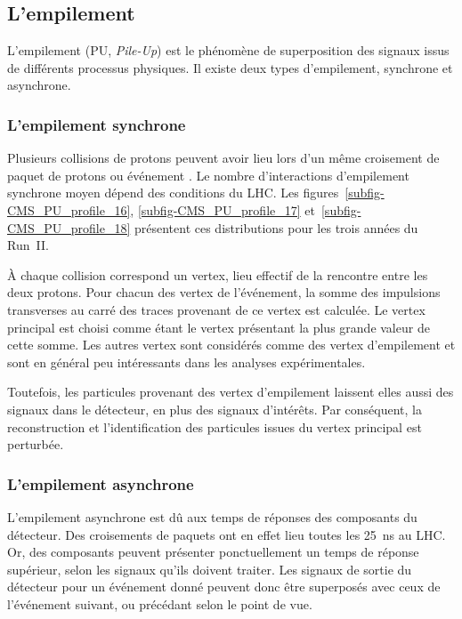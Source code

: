 \subsection{L'empilement}\label{chapter-LHC-section-LHC-subsec-PU}
L'empilement (PU, \emph{Pile-Up}) est le phénomène de superposition des signaux issus de différents processus physiques.
Il existe deux types d'empilement, synchrone et asynchrone.
\subsubsection{L'empilement synchrone}
Plusieurs collisions de protons peuvent avoir lieu lors d'un même  croisement de paquet de protons ou \og événement \fg.
Le nombre d'interactions d'empilement synchrone moyen dépend des conditions du LHC.
Les figures~\ref{subfig-CMS_PU_profile_16}, \ref{subfig-CMS_PU_profile_17} et~\ref{subfig-CMS_PU_profile_18} présentent ces distributions pour les trois années du Run~II.
\par À chaque collision correspond un vertex, lieu effectif de la rencontre entre les deux protons.
Pour chacun des vertex de l'événement, la somme des impulsions transverses au carré des traces provenant de ce vertex est calculée.
Le vertex principal est choisi comme étant le vertex présentant la plus grande valeur de cette somme.
Les autres vertex sont considérés comme des vertex d'empilement et sont en général peu intéressants dans les analyses expérimentales.
\par Toutefois, les particules provenant des vertex d'empilement laissent elles aussi des signaux dans le détecteur, en plus des signaux d'intérêts.
Par conséquent, la reconstruction et l'identification des particules issues du vertex principal est perturbée.
\subsubsection{L'empilement asynchrone}
L'empilement asynchrone est dû aux temps de réponses des composants du détecteur.
Des croisements de paquets ont en effet lieu toutes les \SI{25}{\nano\second} au LHC.
Or, des composants peuvent présenter ponctuellement un temps de réponse supérieur, selon les signaux qu'ils doivent traiter.
Les signaux de sortie du détecteur pour un événement donné peuvent donc être superposés avec ceux de l'événement suivant, ou précédant selon le point de vue.
